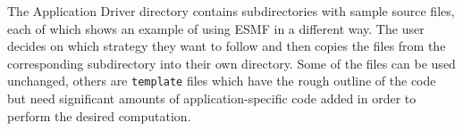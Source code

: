%


The Application Driver directory contains subdirectories with sample
source files, each of which shows an example of using ESMF in a
different way.  The user decides on which strategy they want to follow
and then copies the files from the corresponding subdirectory into
their own directory. Some of the files can be used unchanged, others
are {\tt template} files which have the rough outline of the code but
need significant amounts of application-specific code added in order 
to perform the desired computation.


